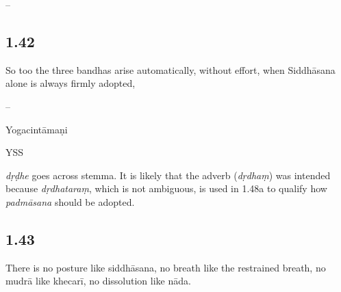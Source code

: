 \begin{ekdosis}
\begin{testimonia}[hp01_041]
\end{testimonia}

\begin{philcomm}[hp01_041]
--
\end{philcomm}

\subsection*{1.42}
\begin{translation}[hp01_042]
So too the three bandhas arise automatically, without effort, when Siddhāsana alone is always firmly adopted,
\end{translation}

\begin{sources}[hp01_042]
--
\end{sources}

\begin{testimonia}[hp01_042]
Yogacintāmaṇi

\begin{versinnote}
\end{versinnote}

YSS

\begin{versinnote}
\end{versinnote}

\end{testimonia}

\begin{philcomm}[hp01_042]
\emph{dṛḍhe} goes across stemma. It is likely that the adverb (\emph{dṛdhaṃ}) was intended because \emph{dṛdhataraṃ}, which is not ambiguous, is used in 1.48a to qualify how \emph{padmāsana} should be adopted.
\end{philcomm}

\subsection*{1.43}
\begin{translation}[hp01_043]
There is no posture like siddhāsana, no breath like the restrained breath, no mudrā like khecarī, no dissolution like nāda.
\end{translation}


\end{ekdosis}
